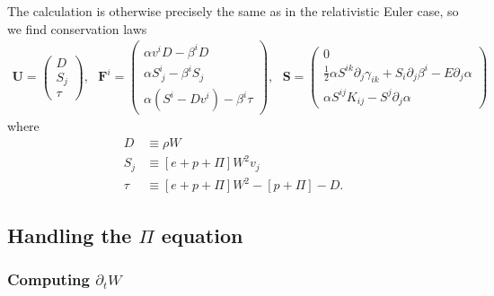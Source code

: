 \documentclass[12pt]{article}
\numberwithin{equation}{section}
\begin{document}
The calculation is otherwise precisely the same as in the relativistic Euler case, so we find conservation laws
\begin{equation}
\begin{aligned}
\bm{U} =
\begin{pmatrix}
D \\
S_j \\
\tau
\end{pmatrix},~~~
\bm{F}^i =
\begin{pmatrix}
\alpha v^i D - \beta^i D \\
\alpha S^{i}_{~j} - \beta^i S_j \\
\alpha (S^i - D v^i) - \beta^i \tau
\end{pmatrix},~~~
\bm{S} =
\begin{pmatrix}
0 \\
\frac{1}{2} \alpha S^{ik} \partial_j \gamma_{ik} + S_i \partial_j \beta^i - E \partial_j \alpha \\
\alpha S^{ij} K_{ij} - S^j \partial_j \alpha
\end{pmatrix}
\end{aligned}
\end{equation}
where
\begin{align}
D &\equiv \rho W \\
S_j &\equiv [e+p+\Pi] W^2 v_j \\
\tau &\equiv [e+p+\Pi] W^2 - [p+\Pi] - D.
\end{align}

\subsection{Handling the $\Pi$ equation}

\subsubsection{Computing $\partial_t W$}
\end{document}
